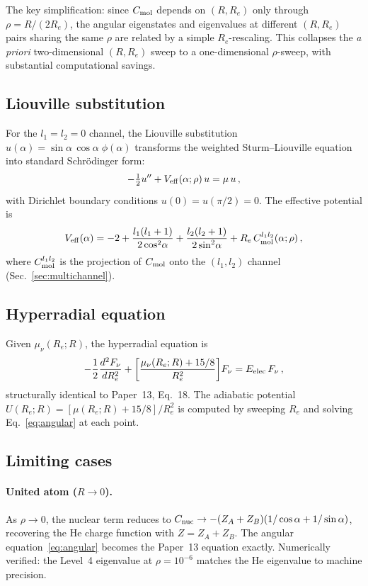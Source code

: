 \documentclass[aps,pra,twocolumn,superscriptaddress,longbibliography]{revtex4-2}
\begin{document}
The key simplification: since $C_{\rm mol}$ depends on $(R,R_e)$
only through $\rho = R/(2R_e)$, the angular eigenstates and eigenvalues
at different $(R,R_e)$ pairs sharing the same $\rho$ are related by a
simple $R_e$-rescaling.  This collapses the \emph{a priori}
two-dimensional $(R,R_e)$ sweep to a one-dimensional $\rho$-sweep,
with substantial computational savings.

\subsection{Liouville substitution}

For the $l_1 = l_2 = 0$ channel, the Liouville substitution
$u(\alpha) = \sin\alpha\,\cos\alpha\;\phi(\alpha)$ transforms
the weighted Sturm--Liouville equation into standard Schr\"odinger form:
\begin{equation}
  -\tfrac{1}{2}u'' + V_{\rm eff}(\alpha;\rho)\,u = \mu\,u\,,
  \label{eq:liouville}
\end{equation}
with Dirichlet boundary conditions $u(0) = u(\pi/2) = 0$.  The
effective potential is
\begin{equation}
  V_{\rm eff}(\alpha) = -2
    + \frac{l_1(l_1+1)}{2\cos^2\!\alpha}
    + \frac{l_2(l_2+1)}{2\sin^2\!\alpha}
    + R_e\,C_{\rm mol}^{l_1 l_2}(\alpha;\rho)\,,
  \label{eq:Veff_alpha}
\end{equation}
where $C_{\rm mol}^{l_1 l_2}$ is the projection of $C_{\rm mol}$ onto
the $(l_1,l_2)$ channel (Sec.~\ref{sec:multichannel}).

\subsection{Hyperradial equation}

Given $\mu_\nu(R_e;R)$, the hyperradial equation is
\begin{equation}
  -\frac{1}{2}\frac{d^2 F_\nu}{dR_e^2}
  + \biggl[\frac{\mu_\nu(R_e;R) + 15/8}{R_e^2}\biggr]F_\nu
  = E_{\rm elec}\,F_\nu\,,
  \label{eq:radial}
\end{equation}
structurally identical to Paper~13, Eq.~18.  The adiabatic potential
$U(R_e;R) = [\mu(R_e;R) + 15/8]/R_e^2$ is computed by sweeping $R_e$
and solving Eq.~\eqref{eq:angular} at each point.

\subsection{Limiting cases}

\paragraph{United atom ($R\to 0$).}
As $\rho \to 0$, the nuclear term reduces to
$C_{\rm nuc} \to -(Z_A+Z_B)(1/\cos\alpha + 1/\sin\alpha)$,
recovering the He charge function with $Z = Z_A + Z_B$.
The angular equation~\eqref{eq:angular} becomes the Paper~13 equation
exactly.  Numerically verified: the Level~4 eigenvalue at
$\rho = 10^{-6}$ matches the He eigenvalue to machine precision.
\end{document}
